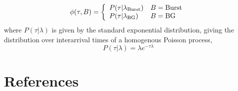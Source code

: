 \documentclass{article}
\begin{document}
\begin{equation}
  \phi(\tau, B) = \left\{
    \begin{array}{l l}
      P(\tau \vert \lambda_\mathrm{Burst})  & B = \mathrm{Burst} \\
      P(\tau \vert \lambda_\mathrm{BG})     & B = \mathrm{BG} \\
    \end{array}
  \right.
\end{equation}
where $P(\tau \vert \lambda)$ is given by the standard exponential
distribution, giving the distribution over interarrival times of a
homogenous Poisson process,
\[ P(\tau \vert \lambda) = \lambda e^{-\tau \lambda} \]

\appendix
\section{References}


\end{document}
